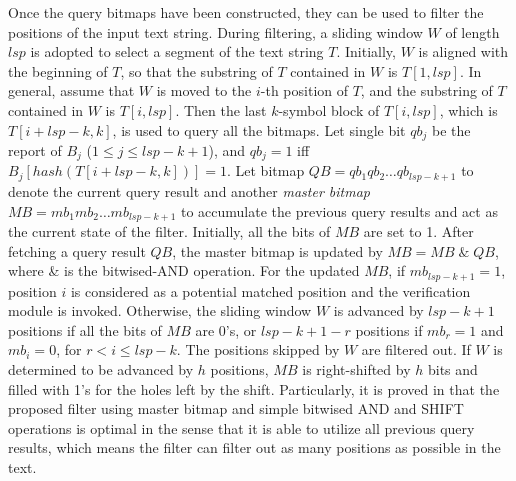 \documentclass{article}
\begin{document}

Once the query bitmaps have been constructed, they can be used to
filter the positions of the input text string. During filtering, a
sliding window $W$ of length $lsp$ is adopted to select a segment of
the text string $T$. Initially, $W$ is aligned with the beginning of
$T$, so that the substring of $T$ contained in $W$ is $T[1,lsp]$. In
general, assume that $W$ is moved to the $i$-th position of $T$, and
the substring of $T$ contained in $W$ is $T[i,lsp]$. Then the last
$k$-symbol block of $T[i,lsp]$, which is $T[i+lsp-k, k]$, is used to
query all the bitmaps. Let single bit $qb_j$ be the report of $B_j$
($1 \leq j \leq lsp - k + 1$), and $qb_j=1$ iff
$B_j[hash(T[i+lsp-k,k])] = 1$. Let bitmap
$QB = qb_1qb_2 \dots qb_{lsp-k+1}$ to denote the current query result
and another \emph{master bitmap} $MB = mb_1mb_2 \dots mb_{lsp-k+1}$ to
accumulate the previous query results and act as the current state of
the filter. Initially, all the bits of $MB$ are set to 1. After
fetching a query result $QB$, the master bitmap is updated by
$MB = MB \; \& \; QB$, where \& is the bitwised-AND operation. For the
updated $MB$, if $mb_{lsp-k+1} = 1$, position $i$ is considered as a
potential matched position and the verification module is
invoked. Otherwise, the sliding window $W$ is advanced by $lsp-k+1$
positions if all the bits of $MB$ are 0's, or $lsp-k+1-r$ positions if
$mb_r=1$ and $mb_i=0$, for $r < i \leq lsp-k$. The positions skipped
by $W$ are filtered out. If $W$ is determined to be advanced by $h$
positions, $MB$ is right-shifted by $h$ bits and filled with 1's for
the holes left by the shift. Particularly, it is proved in
\cite{Lee2013} that the proposed filter using master bitmap and simple
bitwised AND and SHIFT operations is optimal in the sense that it is
able to utilize all previous query results, which means the filter can
filter out as many positions as possible in the text.
\end{document}
